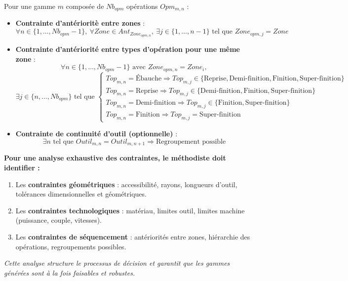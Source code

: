 \documentclass{article}
\begin{document}
Pour une gamme $m$ composée de $Nb_{opm}$ opérations $Opm_{m,n}$ :

\begin{itemize}
    \item \textbf{Contrainte d'antérioritè entre zones} :
    \[
    \forall n \in \{1,\dots,Nb_{opm}-1\}, \ \forall Zone \in Ant_{Zone_{opm,n}}, \ \exists j \in \{1,\dots,n-1\} \text{ tel que } Zone_{opm,j} = Zone
    \]
    
    \item \textbf{Contrainte d'antériorité entre types d'opération pour une même zone} :
    \[
    \forall n \in \{1,\dots,Nb_{opm}-1\} \text{ avec } Zone_{opm,n} = Zone_i,
    \]
    \[
    \exists j \in \{n,\dots,Nb_{opm}\} \text{ tel que } 
    \begin{cases}
    Top_{m,n} = \text{Ébauche} \Rightarrow Top_{m,j} \in \{\text{Reprise}, \text{Demi-finition}, \text{Finition}, \text{Super-finition}\} \\
    Top_{m,n} = \text{Reprise} \Rightarrow Top_{m,j} \in \{\text{Demi-finition}, \text{Finition}, \text{Super-finition}\} \\
    Top_{m,n} = \text{Demi-finition} \Rightarrow Top_{m,j} \in \{\text{Finition}, \text{Super-finition}\} \\
    Top_{m,n} = \text{Finition} \Rightarrow Top_{m,j} = \text{Super-finition}
    \end{cases}
    \]
    
    \item \textbf{Contrainte de continuité d'outil (optionnelle)} :
    \[
    \exists n \text{ tel que } Outil_{m,n} = Outil_{m,n+1} \Rightarrow \text{Regroupement possible}
    \]
\end{itemize}

\begin{tcolorbox}[colback=green!5!white, colframe=green!50!black, title=Synthèse : Analyse des Contraintes de Fabrication]
\begin{center}
\textbf{Pour une analyse exhaustive des contraintes, le méthodiste doit identifier :}
\end{center}
\begin{enumerate}
    \item Les \textbf{contraintes géométriques} : accessibilité, rayons, longueurs d'outil, tolérances dimensionnelles et géométriques.
    \item Les \textbf{contraintes technologiques} : matériau, limites outil, limites machine (puissance, couple, vitesses).
    \item Les \textbf{contraintes de séquencement} : antériorités entre zones, hiérarchie des opérations, regroupements possibles.
\end{enumerate}
\textit{Cette analyse structure le processus de décision et garantit que les gammes générées sont à la fois faisables et robustes.}
\end{tcolorbox}
\end{document}
